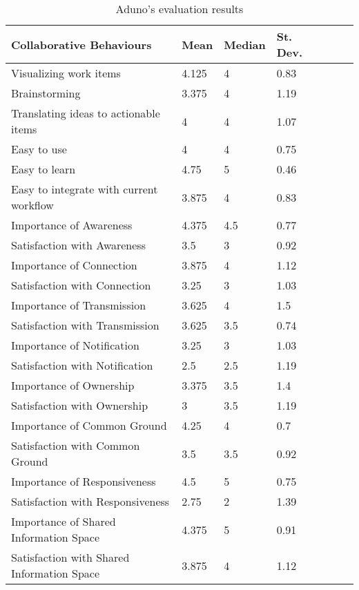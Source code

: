 \documentclass[conference]{IEEEtran}
\begin{document}
\begin{table}[h]
\begin{center}
\begin{tabular}{@{\hspace{.1cm}}llll@{\hspace{0cm}}c@{\hspace{0cm}}c@{\hspace{0cm}}c@{\hspace{.1cm}}}
\hline
Collaborative Behaviours&  Mean&   Median&  St. Dev.&\\
\hline
Visualizing work items& 4.125& 4& 0.83\\
Brainstorming& 3.375& 4& 1.19\\
Translating ideas to actionable items& 4& 4& 1.07\\
Easy to use& 4& 4& 0.75\\
Easy to learn& 4.75& 5& 0.46\\
Easy to integrate with current workflow& 3.875& 4& 0.83\\
\hline
Importance of Awareness& 4.375& 4.5& 0.77\\
Satisfaction with Awareness& 3.5& 3& 0.92\\
\hline
Importance of Connection& 3.875& 4& 1.12\\
Satisfaction with Connection& 3.25& 3& 1.03\\
\hline
Importance of Transmission& 3.625& 4& 1.5\\
Satisfaction with Transmission& 3.625& 3.5& 0.74\\
\hline
Importance of Notification& 3.25& 3& 1.03\\
Satisfaction with Notification& 2.5& 2.5& 1.19\\
\hline
Importance of Ownership& 3.375& 3.5& 1.4\\
Satisfaction with Ownership& 3& 3.5& 1.19\\
\hline
Importance of Common Ground& 4.25& 4& 0.7\\
Satisfaction with Common Ground& 3.5& 3.5& 0.92\\
\hline
Importance of Responsiveness& 4.5& 5& 0.75\\
Satisfaction with Responsiveness& 2.75& 2& 1.39\\
\hline
Importance of Shared Information Space& 4.375& 5& 0.91\\
Satisfaction with Shared Information Space& 3.875& 4& 1.12\\
\hline
\end{tabular}
\end{center}
\caption{Aduno's evaluation results}
\label{tab:surveyresults}
\end{table}
\end{document}
